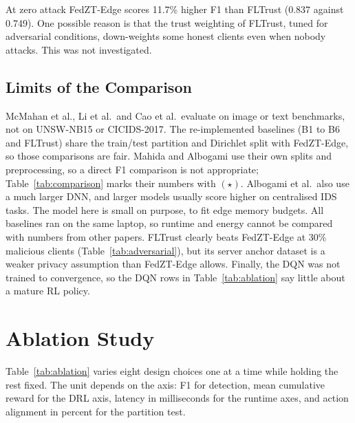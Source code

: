 \documentclass[iicol,Numbered]{sn-jnl}
\begin{document}
At zero attack FedZT-Edge scores 11.7\% higher F1 than FLTrust (0.837 against
0.749). One possible reason is that the trust weighting of FLTrust, tuned for
adversarial conditions, down-weights some honest clients even when nobody
attacks. This was not investigated.

\subsection{Limits of the Comparison}

McMahan et al., Li et al.\ and Cao et al.\ evaluate on image or text benchmarks,
not on UNSW-NB15 or CICIDS-2017. The re-implemented baselines (B1 to B6 and
FLTrust) share the train/test partition and Dirichlet split with FedZT-Edge, so
those comparisons are fair. Mahida and Albogami use their own splits and
preprocessing, so a direct F1 comparison is not appropriate; Table~\ref{tab:comparison}
marks their numbers with $(\star)$. Albogami et al.\ also use a much larger DNN,
and larger models usually score higher on centralised IDS tasks. The model here
is small on purpose, to fit edge memory budgets. All baselines ran on the same
laptop, so runtime and energy cannot be compared with numbers from other papers.
FLTrust clearly beats FedZT-Edge at 30\% malicious clients (Table~\ref{tab:adversarial}),
but its server anchor dataset is a weaker privacy assumption than FedZT-Edge
allows. Finally, the DQN was not trained to convergence, so the DQN rows in
Table~\ref{tab:ablation} say little about a mature RL policy.

\section{Ablation Study}\label{sec:ablation}

Table~\ref{tab:ablation} varies eight design choices one at a time while holding
the rest fixed. The unit depends on the axis: F1 for detection, mean cumulative
reward for the DRL axis, latency in milliseconds for the runtime axes, and
action alignment in percent for the partition test.
\end{document}
